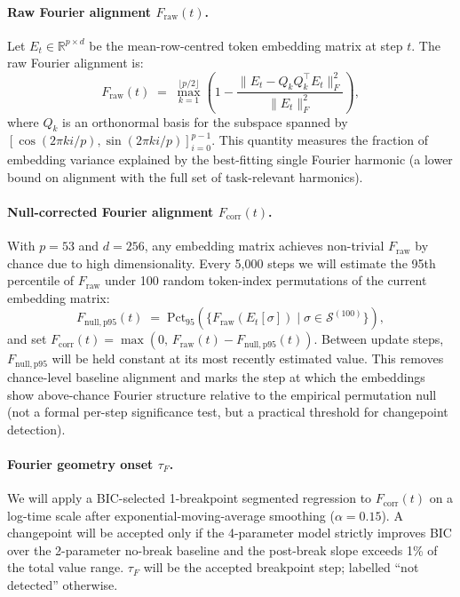 \documentclass[12pt,openany,a4paper]{book}
\newcommand{\tauf}{\tau_{F}}
\newcommand{\fcorr}{F_{\mathrm{corr}}}
\begin{document}
\paragraph{Raw Fourier alignment $F_{\mathrm{raw}}(t)$.}
Let $E_t \in \mathbb{R}^{p \times d}$ be the mean-row-centred token
embedding matrix at step $t$.
The raw Fourier alignment is:
\begin{equation}
  F_{\mathrm{raw}}(t) \;=\;
  \max_{k=1}^{\lfloor p/2\rfloor}
  \!\left(1 - \frac{\|E_t - Q_k Q_k^\top E_t\|_F^2}
  {\|E_t\|_F^2}\right),
  \label{eq:f_raw}
\end{equation}
where $Q_k$ is an orthonormal basis for the subspace spanned by
$[\cos(2\pi k i/p),\sin(2\pi k i/p)]_{i=0}^{p-1}$.
This quantity measures the fraction of embedding variance explained
by the best-fitting single Fourier harmonic (a lower bound on
alignment with the full set of task-relevant harmonics).

\paragraph{Null-corrected Fourier alignment $\fcorr(t)$.}
With $p=53$ and $d=256$, any embedding matrix achieves non-trivial
$F_{\mathrm{raw}}$ by chance due to high dimensionality.
Every 5{,}000 steps we will estimate the 95th percentile of
$F_{\mathrm{raw}}$ under 100 random token-index permutations of the
current embedding matrix:
\begin{equation}
  F_{\mathrm{null,p95}}(t) \;=\;
  \mathrm{Pct}_{95}\!\left(
    \{F_{\mathrm{raw}}(E_t[\sigma]) \mid \sigma \in \mathcal{S}^{(100)}\}
  \right),
\end{equation}
and set $\fcorr(t) = \max(0,\, F_{\mathrm{raw}}(t) - F_{\mathrm{null,p95}}(t))$.
Between update steps, $F_{\mathrm{null,p95}}$ will be held constant at its
most recently estimated value.
This removes chance-level baseline alignment and marks the step at
which the embeddings show above-chance Fourier structure relative to
the empirical permutation null (not a formal per-step significance
test, but a practical threshold for changepoint detection).

\paragraph{Fourier geometry onset $\tauf$.}
We will apply a BIC-selected 1-breakpoint segmented regression to
$\fcorr(t)$ on a log-time scale after exponential-moving-average
smoothing ($\alpha = 0.15$).
A changepoint will be accepted only if the 4-parameter model strictly
improves BIC over the 2-parameter no-break baseline and the
post-break slope exceeds 1\% of the total value range.
$\tauf$ will be the accepted breakpoint step; labelled ``not detected''
otherwise.
\end{document}

